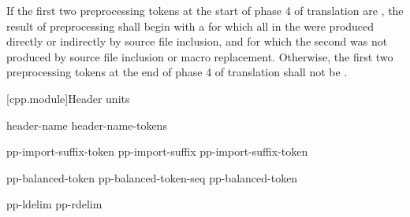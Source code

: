 \pnum
If the first two preprocessing tokens at the start of phase 4 of translation
are  \tcode{;},
the result of preprocessing shall begin with
a 
for which all 
in the 
were produced directly or indirectly by source file inclusion,
and for which the second  
was not produced by source file inclusion or
macro replacement.
Otherwise,
the first two preprocessing tokens at the end of phase 4 of translation
shall not be  \tcode{;}.

[cpp.module]{Header units}
%
%

\begin{bnf}
\br
      
\end{bnf}

\begin{bnf}
\br
\end{bnf}

\begin{bnf}
\br
     header-name  \terminal{;}\br
     header-name-tokens  \terminal{;}
\end{bnf}

\begin{bnf}
\br
    pp-import-suffix-token\br
    pp-import-suffix pp-import-suffix-token
\end{bnf}

\begin{bnf}
\br
\end{bnf}

\begin{bnf}
\br
    pp-balanced-token\br
    pp-balanced-token-seq pp-balanced-token
\end{bnf}

\begin{bnf}
\br
    pp-ldelim  pp-rdelim\br
\end{bnf}

